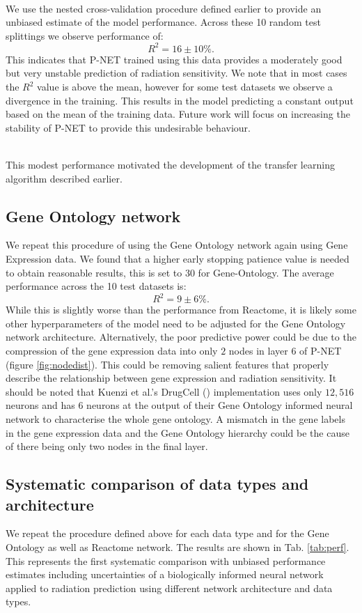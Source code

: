 \documentclass[NOTE, disdraft=true, UKenglish]{\DISCDTLATEXPATH UCLCDTDISdoc}
\begin{document}
\\ \indent We use the nested cross-validation procedure defined earlier to provide an unbiased estimate of the model performance. 
Across these 10 random test splittings we observe performance of:
\begin{equation}
    R^2=16 \pm 10 \%.
\end{equation}
This indicates that P-NET trained using this data provides a moderately good but very unstable prediction of radiation sensitivity. We note that in most cases the $R^2$ value is above the mean, however for some test datasets we observe a divergence in the training. This results in the model predicting a constant output based on the mean of the training data. Future work will focus on increasing the stability of P-NET to provide this undesirable behaviour.

\\ \indent 
This modest performance motivated the development of the transfer learning algorithm described earlier.
\subsection{Gene Ontology network}
We repeat this procedure of using the Gene Ontology network again using Gene Expression data. We found that a higher early stopping patience value is needed to obtain reasonable results, this is set to 30 for Gene-Ontology. 
The average performance across the 10 test datasets is:
\begin{equation}
    R^2=9\pm 6 \%.
\end{equation}
While this is slightly worse than the performance from Reactome, it is likely some other hyperparameters of the model need to be adjusted for the Gene Ontology network architecture. Alternatively, the poor predictive power could be due to the compression of the gene expression data into only $2$ nodes in layer 6 of P-NET (figure \ref{fig:nodedist}). This could be removing salient features that properly describe the relationship between gene expression and radiation sensitivity. It should be noted that Kuenzi et al.'s DrugCell (\cite{kuenzi_predicting_2020}) implementation uses only $12, 516$ neurons and has $6$ neurons at the output of their Gene Ontology informed neural network to characterise the whole gene ontology. A mismatch in the gene labels in the gene expression data and the Gene Ontology hierarchy could be the cause of there being only two nodes in the final layer.

\subsection{Systematic comparison of data types and architecture}
We repeat the procedure defined above for each data type and for the Gene Ontology as well as Reactome network. The results are shown in Tab. \ref{tab:perf}.  
This represents the first systematic comparison with unbiased performance estimates including uncertainties of a biologically informed neural network applied to radiation prediction using different network architecture and data types.
\end{document}
